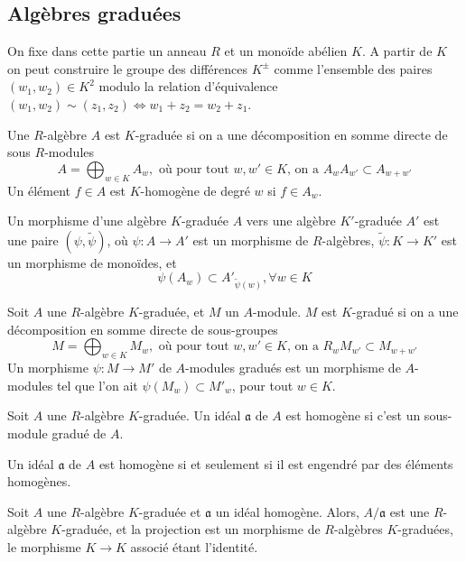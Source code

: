 \subsection{Algèbres graduées}

On fixe dans cette partie un anneau $R$ et un monoïde abélien $K$. A partir de $K$ on peut construire le groupe des différences $K^{\pm}$ comme l'ensemble des paires $(w_1,w_2)\in K^2$ modulo la relation d'équivalence $(w_1,w_2)\sim (z_1,z_2)\iff w_1+z_2=w_2+z_1$. 

\begin{defn}
Une $R$-algèbre $A$ est $K$-graduée si on a une décomposition en somme directe de sous $R$-modules 
$$A=\bigoplus_{w\in K}A_w,\text{ où pour tout } w,w'\in K\text{, on a }A_wA_{w'}\subset A_{w+w'}$$
Un élément $f\in A$ est $K$-homogène de degré $w$ si $f\in A_w$.

Un morphisme d'une algèbre $K$-graduée $A$ vers une algèbre $K'$-graduée $A'$ est une paire $(\psi,\widetilde{\psi})$, où $\psi:A\rightarrow A'$ est un morphisme de $R$-algèbres, $\widetilde{\psi}:K\rightarrow K'$ est un morphisme de monoïdes, et
$$\psi(A_w)\subset A'_{\widetilde{\psi}(w)}, \forall w\in K$$  
\end{defn}

\begin{defn}
Soit $A$ une $R$-algèbre $K$-graduée, et $M$ un $A$-module. $M$ est $K$-gradué si on a une décomposition en somme directe de sous-groupes
$$M=\bigoplus_{w\in K}M_w,\text{ où pour tout } w,w'\in K\text{, on a }R_wM_{w'}\subset M_{w+w'}$$
Un morphisme $\psi:M\rightarrow M'$ de $A$-modules gradués est un morphisme de $A$-modules tel que l'on ait $\psi(M_w)\subset M'_w$, pour tout $w\in K$.
\end{defn}

\begin{defn}
Soit $A$ une $R$-algèbre $K$-graduée. Un idéal $\mathfrak{a}$ de $A$ est homogène si c'est un sous-module gradué de $A$.
\end{defn}

\begin{prop}
Un idéal $\mathfrak{a}$ de $A$ est homogène si et seulement si il est engendré par des éléments homogènes.
\end{prop}

\begin{rem}
Soit $A$ une $R$-algèbre $K$-graduée et $\mathfrak{a}$ un idéal homogène. Alors, $A/\mathfrak{a}$ est une $R$-algèbre $K$-graduée, et la projection est un morphisme de $R$-algèbres $K$-graduées, le morphisme $K\rightarrow K$ associé étant l'identité.
\end{rem}

